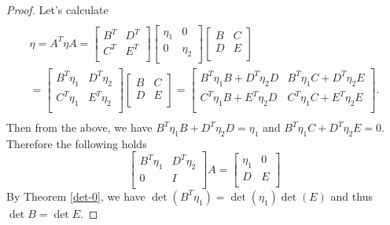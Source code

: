 \documentclass[main.tex]{subfiles}
\begin{document}
\begin{proof}
\noindent
Let's calculate
\begin{multline*}
\\
\eta = A^T \eta A = \begin{bmatrix}
    B^T &  D^T \\
    C^T & E^T \\
\end{bmatrix}
\begin{bmatrix}
    \eta_1 &  0 \\
    0 & \eta_2 \\
\end{bmatrix}
\begin{bmatrix}
    B &  C \\
    D & E \\
\end{bmatrix}
\\ = \begin{bmatrix}
    B^T\eta_1 &  D^T\eta_2 \\
    C^T\eta_1 & E^T\eta_2 \\
\end{bmatrix}
\begin{bmatrix}
    B &  C \\
    D & E \\
\end{bmatrix}
= \begin{bmatrix}
    B^T\eta_1B + D^T\eta_2 D &  B^T\eta_1 C + D^T\eta_2E \\
    C^T\eta_1 B + E^T\eta_2 D & C^T\eta_1C + E^T\eta_2 E \\
\end{bmatrix}.
\\
\end{multline*} 
Then from the above, we have $B^T\eta_1B + D^T\eta_2 D = \eta_1$ and $B^T\eta_1 C + D^T\eta_2E = 0$.
Therefore the following holds
\begin{equation}
\begin{bmatrix}
    B^T\eta_1 &  D^T\eta_2 \\
    0 & I \\
\end{bmatrix} 
A = 
\begin{bmatrix}
    \eta_1 &  0 \\
    D & E \\
\end{bmatrix}
\end{equation}
By Theorem \ref{det-0}, we have $\det(B^T\eta_1) = \det(\eta_1)\det (E)$ and thus $\det B = \det E$.
\end{proof}
\end{document}
